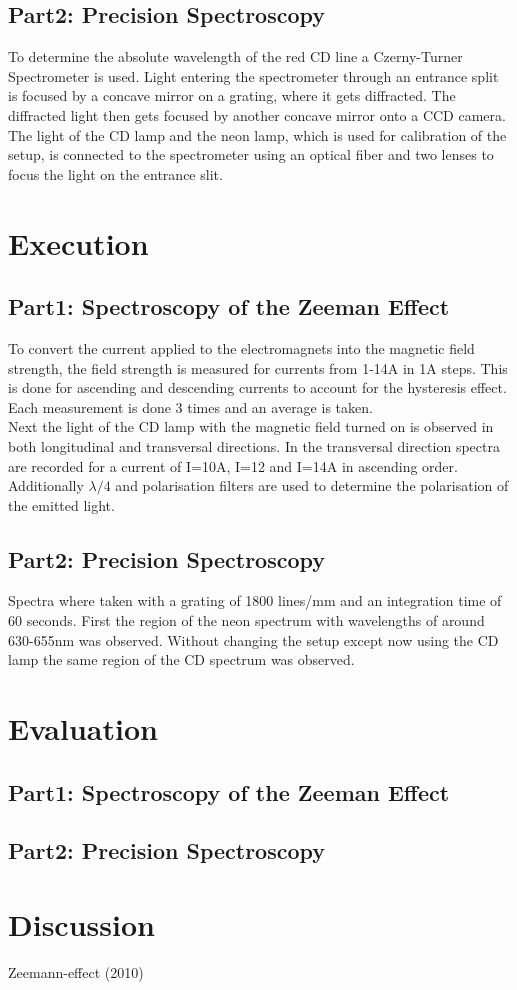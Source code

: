 \documentclass[12pt]{article}
\begin{document}
\subsection{Part2: Precision Spectroscopy}
To determine the absolute wavelength of the red CD line a Czerny-Turner Spectrometer is used. Light entering the spectrometer through an entrance split is focused by a concave mirror on a grating, where it gets diffracted. The diffracted light then gets focused by another concave mirror onto a CCD camera. The light of the CD lamp and the neon lamp, which is used for calibration of the setup, is connected to the spectrometer using an optical fiber and two lenses to focus the light on the entrance slit. 

\section{Execution}
\subsection{Part1: Spectroscopy of the Zeeman Effect}
To convert the current applied to the electromagnets into the magnetic field strength, the field strength is measured for currents from 1-14A in 1A steps. This is done for ascending and descending currents to account for the hysteresis effect. Each measurement is done 3 times and an average is taken.
\\Next the light of the CD lamp with the magnetic field turned on is observed in both longitudinal and transversal directions. In the transversal direction spectra are recorded for a current of I=10A, I=12 and I=14A in ascending order. Additionally $\lambda/4$ and polarisation filters are used to determine the polarisation of the emitted light. 
\subsection{Part2: Precision Spectroscopy}
Spectra where taken with a grating of 1800 lines/mm and an integration time of 60 seconds. First the region of the neon spectrum with wavelengths of around 630-655nm was observed. Without changing the setup except now using the CD lamp the same region of the CD spectrum was observed. 
\section{Evaluation}
\subsection{Part1: Spectroscopy of the Zeeman Effect}

\subsection{Part2: Precision Spectroscopy}


\section{Discussion}

\newpage
\begin{thebibliography}{00}   %

 Zeemann-effect (2010)

\end{thebibliography}
\end{document}
